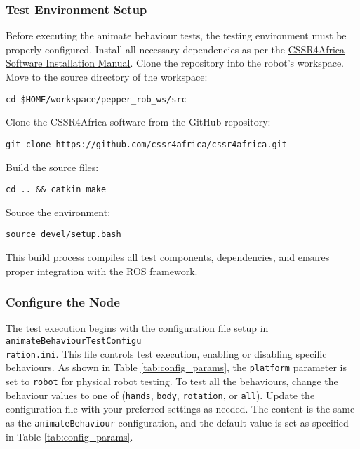 \documentclass{CSSRforAfrica}
\begin{document}
\subsubsection*{Test Environment Setup}
Before executing the animate behaviour tests, the testing environment must be properly configured. Install all necessary dependencies as per the \href{https://github.com/cssr4africa/cssr4africa/blob/main/docs/D3.3_Software_Installation_Manual.pdf}{CSSR4Africa Software Installation Manual}. Clone the repository into the robot's workspace.\\[1em]
Move to the source directory of the workspace:\\
\begin{lstlisting}[style=linuxbashstyle]
cd $HOME/workspace/pepper_rob_ws/src
\end{lstlisting}
Clone the CSSR4Africa software from the GitHub repository:\\
\begin{lstlisting}[style=linuxbashstyle]
git clone https://github.com/cssr4africa/cssr4africa.git
\end{lstlisting}
 Build the source files:\\
\begin{lstlisting}[style=linuxbashstyle]
cd .. && catkin_make
\end{lstlisting}
Source the environment:\\
\begin{lstlisting}[style=linuxbashstyle]
source devel/setup.bash
\end{lstlisting}
This build process compiles all test components, dependencies, and ensures proper integration with the ROS framework. 

\subsubsection*{Configure the Node}
The test execution begins with the configuration file setup in \texttt{animateBehaviourTestConfigu}\\
\texttt{ration.ini}. This file controls test execution, enabling or disabling specific behaviours. As shown in Table \ref{tab:config_params}, the \texttt{platform} parameter is set to \texttt{robot} for physical robot testing. To test all the behaviours, change the behaviour values to one of (\texttt{hands}, \texttt{body}, \texttt{rotation}, or \texttt{all}). Update the configuration file with your preferred settings as needed. The content is the same as the \texttt{animateBehaviour} configuration, and the default value is set as specified in Table \ref{tab:config_params}.
\end{document}
